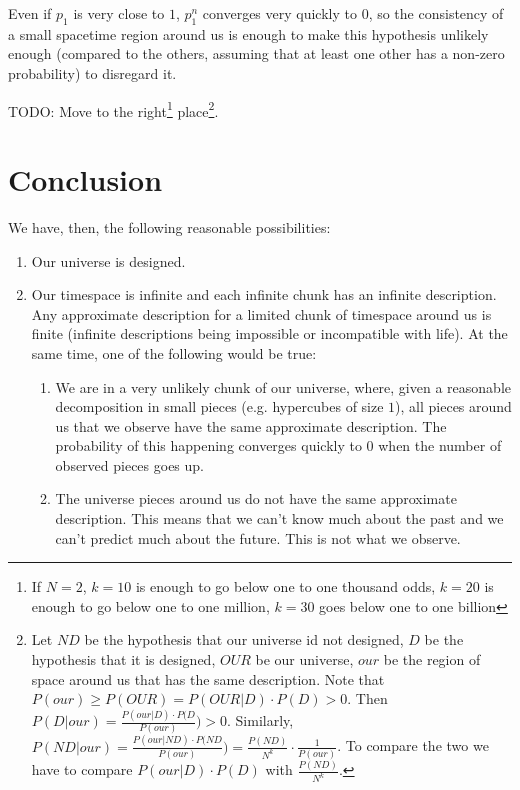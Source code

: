 \documentclass[a4paper
,draft
]{article}
\begin{document}
Even if $p_1$ is very close to $1$, $p_1^n$ converges very quickly to $0$,
so the consistency of a small spacetime region around us is enough
to make this hypothesis unlikely enough (compared to the others, assuming
that at least one other has a non-zero probability) to disregard it.

TODO: Move to the right\footnote{
  If $N=2$, $k=10$ is enough to go below one to one thousand odds,
  $k=20$ is enough to go below one to one million, $k=30$ goes below one to one
  billion
  }
place\footnote{
  Let $ND$ be the hypothesis that our universe id not designed,
  $D$ be the hypothesis that it is designed, $OUR$ be our universe,
  $our$ be the region of space around us that has the same description.
  Note that $P(our) \ge P(OUR)=P(OUR|D)\cdot P(D) > 0$.
  Then $P(D|our) = \frac{P(our|D)\cdot P(D}{P(our)}) > 0$.
  Similarly,
  $P(ND|our) = \frac{P(our|ND)\cdot P(ND}{P(our)})
    = \frac{P(ND)}{N^k} \cdot \frac{1}{P(our)}$.
  To compare the two we have to compare
  $P(our|D)\cdot P(D)$ with $\frac{P(ND)}{N^k}$.
  }.

\section{Conclusion}

We have, then, the following reasonable possibilities:

\begin{enumerate}
\item Our universe is designed.
\item Our timespace is infinite and each infinite chunk has an infinite
      description. Any approximate description for a limited chunk of timespace
      around us is finite (infinite descriptions being impossible or
      incompatible with life). At the same time, one of the following
      would be true:
      \begin{enumerate}
      \item We are in a very unlikely chunk of our universe, where,
            given a reasonable decomposition in small pieces (e.g.
            hypercubes of size $1$), all pieces around us that we observe
            have the same approximate description. The probability
            of this happening converges quickly to $0$ when the number
            of observed pieces goes up.
      \item The universe pieces around us do not have the same
            approximate description. This means that
            we can't know much about the past and we can't
            predict much about the future. This is not what we
            observe.
      \end{enumerate}
\end{enumerate}
\end{document}
